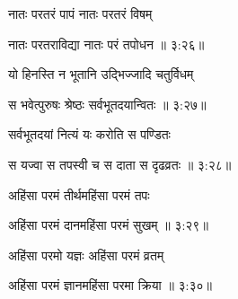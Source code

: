{\devanagarifont नातः परतरं पापं नातः परतरं विषम् \thinspace{\dandab} \dontdisplaylinenum }%
 

{\devanagarifont नातः परतराविद्या नातः परं तपोधन {॥ ३:२६॥} \veg\dontdisplaylinenum }%

{\devanagarifont यो हिनस्ति न भूतानि उद्भिज्जादि चतुर्विधम् \thinspace{\dandab} \dontdisplaylinenum }%


{\devanagarifont स भवेत्पुरुषः श्रेष्ठः सर्वभूतदयान्वितः {॥ ३:२७॥} \veg\dontdisplaylinenum }%

{\devanagarifont सर्वभूतदयां नित्यं यः करोति स पण्डितः \thinspace{\dandab} \dontdisplaylinenum }%


{\devanagarifont स यज्वा स तपस्वी च स दाता स दृढव्रतः {॥ ३:२८॥} \veg\dontdisplaylinenum }%

{\devanagarifont अहिंसा परमं तीर्थमहिंसा परमं तपः \thinspace{\dandab} \dontdisplaylinenum }%


{\devanagarifont अहिंसा परमं दानमहिंसा परमं सुखम् {॥ ३:२९॥} \veg\dontdisplaylinenum }%
  
{\devanagarifont अहिंसा परमो यज्ञः अहिंसा परमं व्रतम् \thinspace{\dandab} \dontdisplaylinenum }%


{\devanagarifont अहिंसा परमं ज्ञानमहिंसा परमा क्रिया {॥ ३:३०॥} \veg\dontdisplaylinenum }%

